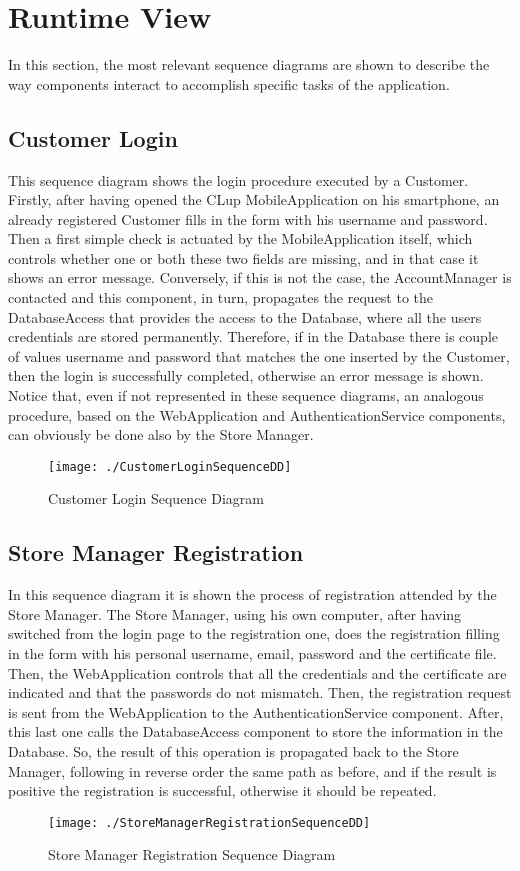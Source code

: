 \section{Runtime View}

In this section, the most relevant sequence diagrams are shown to describe the way components interact to accomplish specific tasks of the application.

\subsection{Customer Login}
This sequence diagram shows the login procedure executed by a Customer. \\
Firstly, after having opened the CLup MobileApplication on his smartphone, an already registered Customer fills in the form with his username and password. Then a first simple check is actuated by the MobileApplication itself, which controls whether one or both these two fields are missing, and in that case it shows an error message. Conversely, if this is not the case, the AccountManager is contacted and this component, in turn, propagates the request to the DatabaseAccess that provides the access to the Database, where all the users credentials are stored permanently. Therefore, if in the Database there is couple of values username and password that matches the one inserted by the Customer, then the login is successfully completed, otherwise an error message is shown. \\
Notice that, even if not represented in these sequence diagrams, an analogous procedure, based on the WebApplication and AuthenticationService components, can obviously be done also by the Store Manager.
\begin{figure}[H]
\centerline{\texttt{[image: ./CustomerLoginSequenceDD]}}
\caption{Customer Login Sequence Diagram}
\end{figure}

\subsection{Store Manager Registration}
In this sequence diagram it is shown the process of registration attended by the Store Manager. The Store Manager, using his own computer, after having switched from the login page to the registration one, does the registration filling in the form with his personal username, email, password and the certificate file. Then, the WebApplication controls that all the credentials and the certificate are indicated and that the passwords do not mismatch. Then, the registration request is sent from the WebApplication to the AuthenticationService component. After, this last one calls the DatabaseAccess component to store the information in the Database. So, the result of this operation is propagated back to the Store Manager, following in reverse order the same path as before, and if the result is positive the registration is successful, otherwise it should be repeated.
\begin{figure}[H]
\centerline{\texttt{[image: ./StoreManagerRegistrationSequenceDD]}}
\caption{Store Manager Registration Sequence Diagram}
\end{figure}

